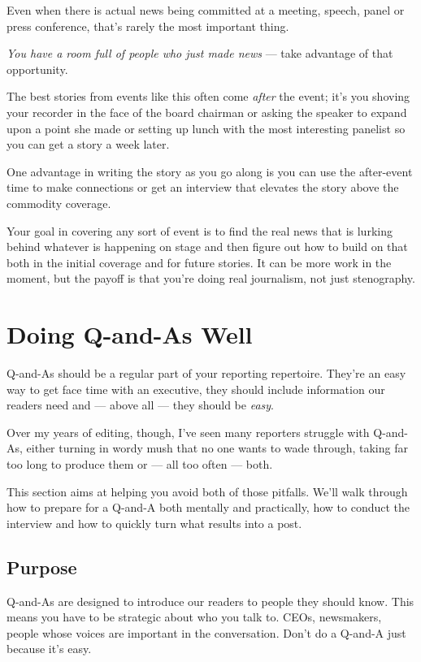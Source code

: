 \documentclass[
  11pt,
  american,
  letterpaperpaper,
  extrafontsizes,onecolumn,openright
  ]{memoir}
\begin{document}
Even when there is actual news being committed at a meeting, speech, panel or press conference, that's rarely the most important thing.

\emph{You have a room full of people who just made news} --- take advantage of that opportunity.

The best stories from events like this often come \emph{after} the event; it's you shoving your recorder in the face of the board chairman or asking the speaker to expand upon a point she made or setting up lunch with the most interesting panelist so you can get a story a week later.

One advantage in writing the story as you go along is you can use the after-event time to make connections or get an interview that elevates the story above the commodity coverage.

Your goal in covering any sort of event is to find the real news that is lurking behind whatever is happening on stage and then figure out how to build on that both in the initial coverage and for future stories. It can be more work in the moment, but the payoff is that you're doing real journalism, not just stenography.

\hypertarget{doing-q-and-as-well}{%
\chapter{Doing Q-and-As Well}\label{doing-q-and-as-well}}

Q-and-As should be a regular part of your reporting repertoire. They're an easy way to get face time with an executive, they should include information our readers need and --- above all --- they should be \emph{easy}.

Over my years of editing, though, I've seen many reporters struggle with Q-and-As, either turning in wordy mush that no one wants to wade through, taking far too long to produce them or --- all too often --- both.

This section aims at helping you avoid both of those pitfalls. We'll walk through how to prepare for a Q-and-A both mentally and practically, how to conduct the interview and how to quickly turn what results into a post.

\hypertarget{purpose}{%
\section*{Purpose}\label{purpose}}

Q-and-As are designed to introduce our readers to people they should know. This means you have to be strategic about who you talk to. CEOs, newsmakers, people whose voices are important in the conversation. Don't do a Q-and-A just because it's easy.
\end{document}
